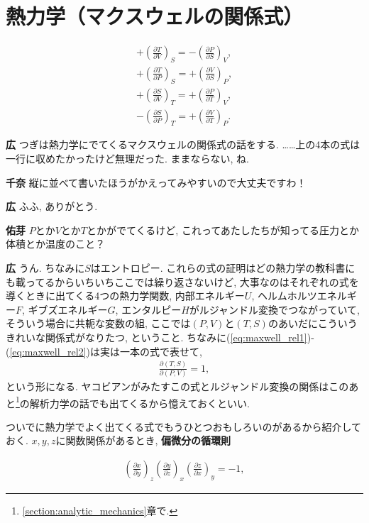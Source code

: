 \documentclass{ltjsarticle}
\theoremstyle{definition}
\newcommand{\parno}{\par\noindent}
\begin{document}
\section{熱力学（マクスウェルの関係式）}
\begin{tcolorbox}
\begin{gather}
+\left(\frac{\partial T}{\partial V}\right)_S=-\left(\frac{\partial P}{\partial S}\right)_V,\label{eq:maxwell_rel1}\\
+\left(\frac{\partial T}{\partial P}\right)_S=+\left(\frac{\partial V}{\partial S}\right)_P,\\
+\left(\frac{\partial S}{\partial V}\right)_T=+\left(\frac{\partial P}{\partial T}\right)_V,\\
-\left(\frac{\partial S}{\partial P}\right)_T=+\left(\frac{\partial V}{\partial T}\right)_P.\label{eq:maxwell_rel2}
\end{gather}
\end{tcolorbox}
\parno
\textbf{広} つぎは熱力学にでてくるマクスウェルの関係式の話をする. ……上の4本の式は一行に収めたかったけど無理だった. ままならない, ね.\parno
\textbf{千奈} 縦に並べて書いたほうがかえってみやすいので大丈夫ですわ！\parno
\textbf{広} ふふ, ありがとう.\parno
\textbf{佑芽} $P$とか$V$とか$T$とかがでてくるけど, これってあたしたちが知ってる圧力とか体積とか温度のこと？\parno
\textbf{広} うん. ちなみに$S$はエントロピー. これらの式の証明はどの熱力学の教科書にも載ってるからいちいちここでは繰り返さないけど, 大事なのはそれぞれの式を導くときに出てくる4つの熱力学関数, 内部エネルギー$U$, ヘルムホルツエネルギー$F$, ギブズエネルギー$G$, エンタルピー$H$がルジャンドル変換でつながっていて, そういう場合に共軛な変数の組, ここでは$(P,V)$と$(T,S)$のあいだにこういうきれいな関係式がなりたつ, ということ. ちなみに(\ref{eq:maxwell_rel1})-(\ref{eq:maxwell_rel2})は実は一本の式で表せて,
\begin{gather}
  \frac{\partial(T,S)}{\partial(P,V)}=1,\label{eq:maxwell_relation_jacobian}
\end{gather}
という形になる. ヤコビアンがみたすこの式とルジャンドル変換の関係はこのあと\footnote{\ref{section:analytic_mechanics}章で.}の解析力学の話でも出てくるから憶えておくといい.\par
ついでに熱力学でよく出てくる式でもうひとつおもしろいのがあるから紹介しておく. $x,y,z$に関数関係があるとき, \textbf{偏微分の循環則}
\begin{tcolorbox}
\begin{gather}
\left(\frac{\partial x}{\partial y}\right)_z\left(\frac{\partial y}{\partial z}\right)_x\left(\frac{\partial z}{\partial x}\right)_y=-1,\label{eq:partial_derivative_cyclic_rule}
\end{gather}
\end{tcolorbox}
\end{document}
